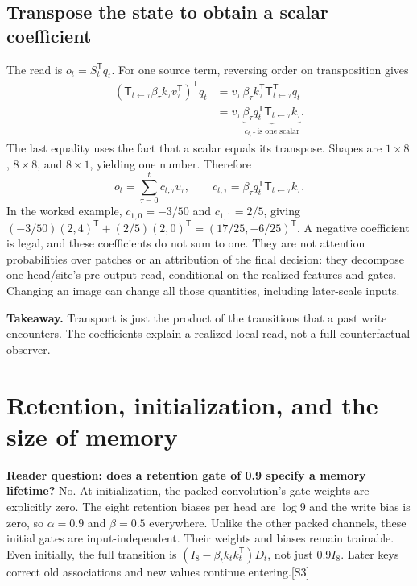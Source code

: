 \documentclass[10pt,letterpaper]{article}
\newcommand{\src}[1]{\textcolor{accent}{\textsf{[#1]}}}
\newcommand{\takeaway}[1]{\par\smallskip\noindent\textbf{Takeaway.} #1}
\newcommand{\psection}[1]{\clearpage\section{#1}}
\begin{document}
\subsection{Transpose the state to obtain a scalar coefficient}
The read is $o_t=S_t^{\mathsf T}q_t$. For one source term, reversing order on transposition gives
\begin{align}
(\mathsf T_{t\leftarrow\tau}\beta_\tau k_\tau v_\tau^{\mathsf T})^{\mathsf T}q_t
&=v_\tau\,\beta_\tau k_\tau^{\mathsf T}\mathsf T_{t\leftarrow\tau}^{\mathsf T}q_t\\
&=v_\tau\,\underbrace{\beta_\tau q_t^{\mathsf T}\mathsf T_{t\leftarrow\tau}k_\tau}_{c_{t,\tau}\ \text{is one scalar}}.
\end{align}
The last equality uses the fact that a scalar equals its transpose. Shapes are $1\times8$, $8\times8$, and $8\times1$, yielding one number. Therefore
\begin{equation}
o_t=\sum_{\tau=0}^{t}c_{t,\tau}v_\tau,\qquad
c_{t,\tau}=\beta_\tau q_t^{\mathsf T}\mathsf T_{t\leftarrow\tau}k_\tau.\label{eq:coeff}
\end{equation}
In the worked example, $c_{1,0}=-3/50$ and $c_{1,1}=2/5$, giving
$(-3/50)(2,4)^{\mathsf T}+(2/5)(2,0)^{\mathsf T}=(17/25,-6/25)^{\mathsf T}$.
A negative coefficient is legal, and these coefficients do not sum to one. They are not attention probabilities over patches or an attribution of the final decision: they decompose one head/site's pre-output read, conditional on the realized features and gates. Changing an image can change all those quantities, including later-scale inputs.
\takeaway{Transport is just the product of the transitions that a past write encounters. The coefficients explain a realized local read, not a full counterfactual observer.}

\psection{Retention, initialization, and the size of memory}
\textbf{Reader question: does a retention gate of 0.9 specify a memory lifetime?}
No. At initialization, the packed convolution's gate weights are explicitly zero. The eight retention biases per head are $\log 9$ and the write bias is zero, so $\alpha=0.9$ and $\beta=0.5$ everywhere. Unlike the other packed channels, these initial gates are input-independent. Their weights and biases remain trainable. Even initially, the full transition is $(I_8-\beta_t k_tk_t^{\mathsf T})D_t$, not just $0.9I_8$. Later keys correct old associations and new values continue entering.\src{S3}
\end{document}
